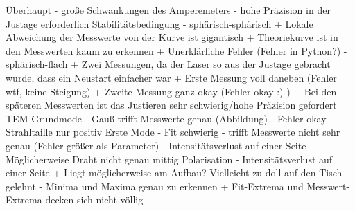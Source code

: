 Überhaupt
- große Schwankungen des Amperemeters
- hohe Präzision in der Justage erforderlich
Stabilitätsbedingung
- sphärisch-sphärisch
  + Lokale Abweichung der Messwerte von der Kurve ist gigantisch
  + Theoriekurve ist in den Messwerten kaum zu erkennen
  + Unerklärliche Fehler (Fehler in Python?)
- sphärisch-flach
  + Zwei Messungen, da der Laser so aus der Justage gebracht wurde, dass ein Neustart einfacher war
  + Erste Messung voll daneben (Fehler wtf, keine Steigung)
  + Zweite Messung ganz okay (Fehler okay :) )
  + Bei den späteren Messwerten ist das Justieren sehr schwierig/hohe Präzision gefordert
TEM-Grundmode
- Gauß trifft Messwerte genau (Abbildung)
- Fehler okay
- Strahltaille nur positiv
Erste Mode
- Fit schwierig
- trifft Messwerte nicht sehr genau (Fehler größer als Parameter)
- Intensitätsverlust auf einer Seite
  + Möglicherweise Draht nicht genau mittig
Polarisation
- Intensitätsverlust auf einer Seite
  + Liegt möglicherweise am Aufbau? Vielleicht zu doll auf den Tisch gelehnt
- Minima und Maxima genau zu erkennen
  + Fit-Extrema und Messwert-Extrema decken sich nicht völlig
